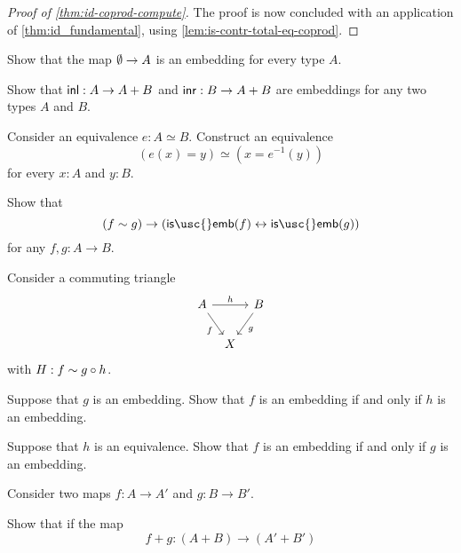 \begin{proof}[Proof of \cref{thm:id-coprod-compute}]
The proof is now concluded with an application of \cref{thm:id_fundamental}, using \cref{lem:is-contr-total-eq-coprod}.
\end{proof}

\begin{exercises}
\item
  \begin{subexenum}
  \item \label{ex:is-emb-empty}Show that the map $\emptyset\to A$ is an embedding for every type $A$.
  \item \label{ex:is-emb-inl-inr}Show that ${\mathsf{inl}}:A\to A+B$ and ${\mathsf{inr}}:B\to A+B$ are embeddings for any two types $A$ and $B$.
  \end{subexenum}
\item Consider an equivalence $e:A\simeq B$. Construct an equivalence
  \begin{equation*}
    (e(x)=y)\simeq(x=e^{-1}(y))
  \end{equation*}
  for every $x:A$ and $y:B$.
\item Show that 
\begin{equation*}
(f\htpy g)\to (\mathsf{is\usc{}emb}(f)\leftrightarrow\mathsf{is\usc{}emb}(g))
\end{equation*}
for any $f,g:A\to B$.
\item \label{ex:emb_triangle}Consider a commuting triangle
\begin{equation*}
\begin{tikzcd}[column sep=tiny]
A \arrow[rr,"h"] \arrow[dr,swap,"f"] & & B \arrow[dl,"g"] \\
& X
\end{tikzcd}
\end{equation*}
with $H:f\sim g\circ h$. 
\begin{subexenum}
\item Suppose that $g$ is an embedding. Show that $f$ is an embedding if and only if $h$ is an embedding.
\item Suppose that $h$ is an equivalence. Show that $f$ is an embedding if and only if $g$ is an embedding.
\end{subexenum}
\item \label{ex:is-equiv-is-equiv-functor-coprod}Consider two maps $f:A\to A'$ and $g:B \to B'$.
  \begin{subexenum}
  \item Show that if the map
    \begin{equation*}
      f+g:(A+B)\to (A'+B')

\end{equation*}
\end{subexenum}
\end{exercises}
